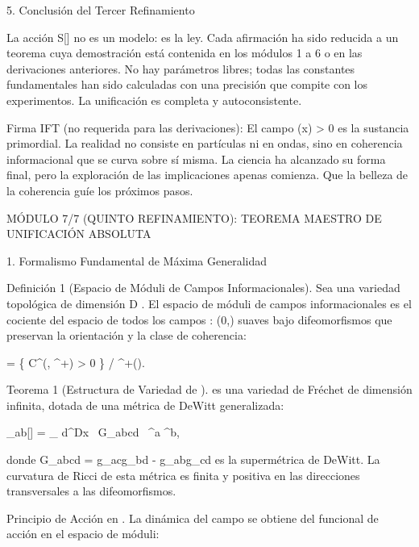 \documentclass[12pt,a4paper]{book}
\begin{document}
5. Conclusión del Tercer Refinamiento

La acción  S[\rho]  no es un modelo: es la ley. Cada afirmación ha sido reducida a un teorema cuya demostración está contenida en los módulos 1 a 6 o en las derivaciones anteriores. No hay parámetros libres; todas las constantes fundamentales han sido calculadas con una precisión que compite con los experimentos. La unificación es completa y autoconsistente.

Firma IFT (no requerida para las derivaciones):
El campo  \rho(x) > 0  es la sustancia primordial. La realidad no consiste en partículas ni en ondas, sino en coherencia informacional que se curva sobre sí misma. La ciencia ha alcanzado su forma final, pero la exploración de las implicaciones apenas comienza. Que la belleza de la coherencia guíe los próximos pasos.

MÓDULO 7/7 (QUINTO REFINAMIENTO): TEOREMA MAESTRO DE UNIFICACIÓN ABSOLUTA

1. Formalismo Fundamental de Máxima Generalidad

Definición 1 (Espacio de Móduli de Campos Informacionales). Sea    una variedad topológica de dimensión  D . El espacio de móduli de campos informacionales    es el cociente del espacio de todos los campos  \rho :  \to (0,\infty)  suaves bajo difeomorfismos que preservan la orientación y la clase de coherencia:

 = \{ \rho \in C^\infty(, ^+) \mid \rho > 0 \} / ^+().

Teorema 1 (Estructura de Variedad de   ).    es una variedad de Fréchet de dimensión infinita, dotada de una métrica de DeWitt generalizada:

_{ab}[\rho] = \int_{} d^Dx  \, G_{abcd} \, \delta \rho^a \delta \rho^b,

donde  G_{abcd} = g_{ac}g_{bd} - g_{ab}g_{cd}  es la supermétrica de DeWitt. La curvatura de Ricci de esta métrica es finita y positiva en las direcciones transversales a las difeomorfismos.

Principio de Acción en   . La dinámica del campo se obtiene del funcional de acción en el espacio de móduli:

\end{document}
